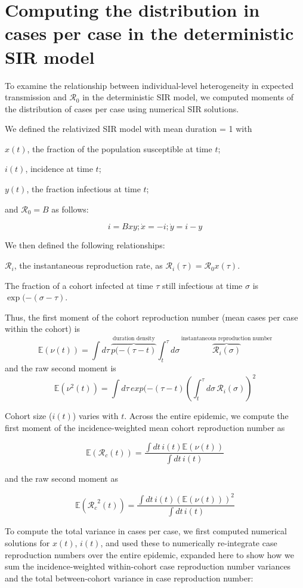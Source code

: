 \documentclass[12pt]{article}
\newcommand{\Rx}[1]{\ensuremath{\mathcal{R}_{#1}}}
\newcommand{\Rc}{\Rx{c}}
\newcommand{\Ro}{\Rx{0}}
\newcommand{\Ri}{\Rx{i}}
\begin{document}
\section{Computing the distribution in cases per case in the deterministic SIR model}

To examine the relationship between individual-level heterogeneity in expected transmission and $\Ro$ in the deterministic SIR model, we computed moments of the distribution of cases per case using numerical SIR solutions. 

We defined the relativized SIR model with mean duration = 1 with 

$x(t)$, the fraction of the population susceptible at time $t$;

$i(t)$, incidence at time $t$; 

$y(t)$, the fraction infectious at time $t$;

and $\Ro = B$ as follows:

$$ i = Bxy; \dot x = -i; \dot y = i-y $$

We then defined the following relationships: 

$\Ri$, the instantaneous reproduction rate, as 
$\Ri(\tau) = \Ro x(\tau)$.

The fraction of a cohort infected at time $\tau$ still infectious at time $\sigma$ is $\exp(-(\sigma-\tau)$. 


Thus, the first moment of the cohort reproduction number (mean cases per case within the cohort) is 
$$\mathbb{E}\left(\nu(t)\right) = \int{d\tau\, \overbrace{p(-(\tau-t)}^{\text{duration density}}\int_{t}^{\tau}{d\sigma\,  \overbrace{\Ri (\sigma)}^{\text{instantaneous reproduction number}} }}$$
and the raw second moment is 
$$\mathbb{E}\left(\nu^2(t)\right) = \int{d\tau\, exp(-(\tau-t)\left(\int_t^\tau{d\sigma\,\Ri (\sigma)} \right)^2}$$

Cohort size ($i(t)$) varies with $t$. Across the entire epidemic, we compute the first moment of the incidence-weighted mean cohort reproduction number as

$$\mathbb{E}(\Rc(t)) = \frac{\int{dt\, i(t) \mathbb{E}\left(\nu(t)\right)}}{\int{dt\, i(t)}}$$

and the raw second moment as 

$$\mathbb{E}(\Rc^2(t)) = \frac{\int{dt\, i(t) \left(\mathbb{E}\left(\nu(t)\right)\right)^2}}{\int{dt\, i(t)}}$$

To compute the total variance in cases per case, we first computed numerical solutions for $x(t)$, $i(t)$, and used these to numerically re-integrate case reproduction numbers over the entire epidemic, expanded here to show how we sum the incidence-weighted within-cohort case reproduction number variances and the total between-cohort variance in case reproduction number: 
\end{document}

